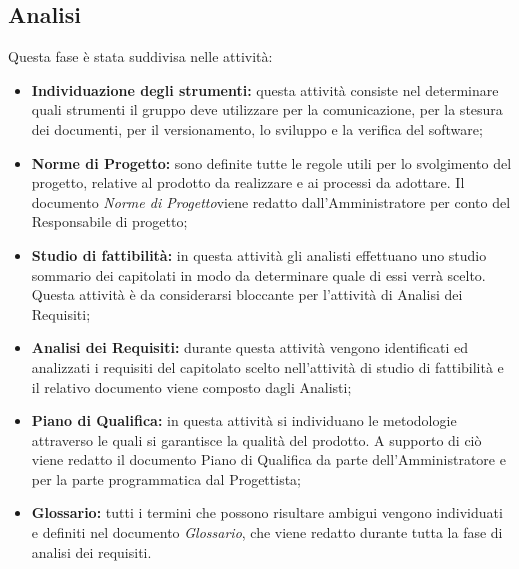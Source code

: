 \subsection{Analisi}
Questa fase è stata suddivisa nelle attività:
\begin{itemize}
	\item \textbf{Individuazione degli strumenti:} questa attività consiste nel determinare quali strumenti il gruppo deve utilizzare per la comunicazione, per la stesura dei documenti, per il versionamento, lo sviluppo e la verifica del software;
	\item \textbf{Norme di Progetto:} sono definite tutte le regole utili per lo svolgimento del progetto, relative al prodotto da realizzare e ai processi da adottare. Il documento \textit{Norme di Progetto}\doc viene redatto dall'Amministratore per conto del Responsabile di progetto;
	\item \textbf{Studio di fattibilità:} in questa attività gli analisti effettuano uno studio sommario dei capitolati in modo da determinare quale di essi verrà scelto. Questa attività è da considerarsi bloccante per l’attività di Analisi dei Requisiti;
	\item \textbf{Analisi dei Requisiti:} durante questa attività vengono identificati ed analizzati i requisiti del capitolato scelto nell'attività di studio di fattibilità e il relativo documento viene composto dagli Analisti;
	\item \textbf{Piano di Qualifica:} in questa attività si individuano le metodologie attraverso le quali si garantisce la qualità del prodotto. A supporto di ciò viene redatto il documento Piano di Qualifica da parte dell'Amministratore e per la parte programmatica dal Progettista;
	\item \textbf{Glossario:} tutti i termini che possono risultare ambigui vengono individuati e definiti nel documento \textit{Glossario}\docs, che viene redatto durante tutta la fase di analisi dei requisiti.
\end{itemize}
